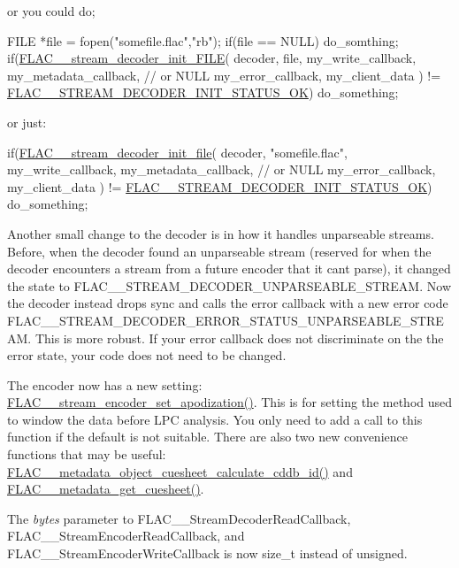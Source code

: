 or you could do;


\begin{DoxyCode}
[...]
FILE *file = fopen(\textcolor{stringliteral}{"somefile.flac"},\textcolor{stringliteral}{"rb"});
\textcolor{keywordflow}{if}(file == NULL) do\_somthing;
\textcolor{keywordflow}{if}(\hyperlink{group__flac__stream__decoder_ga38f9eb46bf112af205f86b4cbac9980c}{FLAC\_\_stream\_decoder\_init\_FILE}(
  decoder,
  file,
  my\_write\_callback,
  my\_metadata\_callback,  \textcolor{comment}{// or NULL}
  my\_error\_callback,
  my\_client\_data
) != \hyperlink{group__flac__stream__decoder_ggaaed54a24ac6310d29c5cafba79759c44ac94c7e9396f30642f34805e5d626e011}{FLAC\_\_STREAM\_DECODER\_INIT\_STATUS\_OK}) do\_something;
\end{DoxyCode}


or just\+:


\begin{DoxyCode}
[...]
\textcolor{keywordflow}{if}(\hyperlink{group__flac__stream__decoder_ga1692108a97012d1c5f79baf7df012c33}{FLAC\_\_stream\_decoder\_init\_file}(
  decoder,
  \textcolor{stringliteral}{"somefile.flac"},
  my\_write\_callback,
  my\_metadata\_callback,  \textcolor{comment}{// or NULL}
  my\_error\_callback,
  my\_client\_data
) != \hyperlink{group__flac__stream__decoder_ggaaed54a24ac6310d29c5cafba79759c44ac94c7e9396f30642f34805e5d626e011}{FLAC\_\_STREAM\_DECODER\_INIT\_STATUS\_OK}) do\_something;
\end{DoxyCode}


Another small change to the decoder is in how it handles unparseable streams. Before, when the decoder found an unparseable stream (reserved for when the decoder encounters a stream from a future encoder that it can\textquotesingle{}t parse), it changed the state to {\ttfamily F\+L\+A\+C\+\_\+\+\_\+\+S\+T\+R\+E\+A\+M\+\_\+\+D\+E\+C\+O\+D\+E\+R\+\_\+\+U\+N\+P\+A\+R\+S\+E\+A\+B\+L\+E\+\_\+\+S\+T\+R\+E\+AM}. Now the decoder instead drops sync and calls the error callback with a new error code {\ttfamily F\+L\+A\+C\+\_\+\+\_\+\+S\+T\+R\+E\+A\+M\+\_\+\+D\+E\+C\+O\+D\+E\+R\+\_\+\+E\+R\+R\+O\+R\+\_\+\+S\+T\+A\+T\+U\+S\+\_\+\+U\+N\+P\+A\+R\+S\+E\+A\+B\+L\+E\+\_\+\+S\+T\+R\+E\+AM}. This is more robust. If your error callback does not discriminate on the the error state, your code does not need to be changed.

The encoder now has a new setting\+: \hyperlink{group__flac__stream__encoder_ga83d38fd6fca7abbf8363bdc2536a299e}{F\+L\+A\+C\+\_\+\+\_\+stream\+\_\+encoder\+\_\+set\+\_\+apodization()}. This is for setting the method used to window the data before L\+PC analysis. You only need to add a call to this function if the default is not suitable. There are also two new convenience functions that may be useful\+: \hyperlink{group__flac__metadata__object_ga897138ca0a985d8741f73d6657f38845}{F\+L\+A\+C\+\_\+\+\_\+metadata\+\_\+object\+\_\+cuesheet\+\_\+calculate\+\_\+cddb\+\_\+id()} and \hyperlink{group__flac__metadata__level0_ga6ee2633dc179c2a0cb5fef5762faf0fd}{F\+L\+A\+C\+\_\+\+\_\+metadata\+\_\+get\+\_\+cuesheet()}.

The {\itshape bytes} parameter to F\+L\+A\+C\+\_\+\+\_\+\+Stream\+Decoder\+Read\+Callback, F\+L\+A\+C\+\_\+\+\_\+\+Stream\+Encoder\+Read\+Callback, and F\+L\+A\+C\+\_\+\+\_\+\+Stream\+Encoder\+Write\+Callback is now {\ttfamily size\+\_\+t} instead of {\ttfamily unsigned}. 